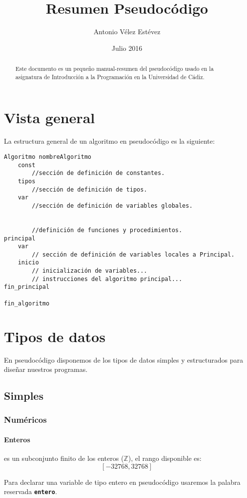 \documentclass{article}
\title{Resumen Pseudocódigo}
\author{Antonio Vélez Estévez}
\date{Julio 2016}
\newcommand{\pkeyword}[1]{\textcolor{azulpseudo}{\texttt{\textbf{#1}}}}
\begin{document}
\maketitle


\begin{abstract}
Este documento es un pequeño manual-resumen del pseudocódigo usado en la asignatura de Introducción a la Programación en la Universidad de Cádiz.
\end{abstract}
\tableofcontents
\pagebreak
\section{Vista general}
La estructura general de un algoritmo en pseudocódigo es la siguiente:

\begin{lstlisting}[language=pseudocodigoesp]
Algoritmo nombreAlgoritmo
    const
        //sección de definición de constantes.
    tipos
        //sección de definición de tipos.
    var
        //sección de definición de variables globales.


        //definición de funciones y procedimientos.
principal
    var
        // sección de definición de variables locales a Principal.
    inicio
        // inicialización de variables...
        // instrucciones del algoritmo principal...
fin_principal

fin_algoritmo
\end{lstlisting}

\section{Tipos de datos}
En pseudocódigo disponemos de los tipos de datos simples y estructurados para diseñar nuestros programas.
\subsection{Simples}
\subsubsection{Numéricos}
\paragraph{Enteros} es un subconjunto finito de los enteros ($\mathbb{Z}$), el rango disponible es: $$\left[-32768, 32768\right]$$

Para declarar una variable de tipo entero en pseudocódigo usaremos la palabra reservada \pkeyword{entero}.
\end{document}
